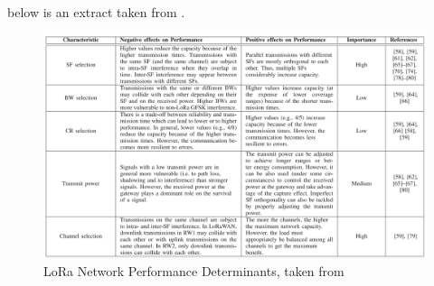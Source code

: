 \documentclass[a4paper,twoside,12pt]{report}
\begin{document}
 below is an extract taken from \cite{Gkotsiopoulos2021PerformanceReview}.

\begin{figure}[ht]
	\centering
	\includegraphics[width=1\linewidth]{images/GkotsLoRaPerf.PNG}
	\caption{LoRa Network Performance Determinants, taken from \cite{Gkotsiopoulos2021PerformanceReview}}
	\label{fig:LoRaTablePerf}
\end{figure}

\nocite{*}

\end{document}
